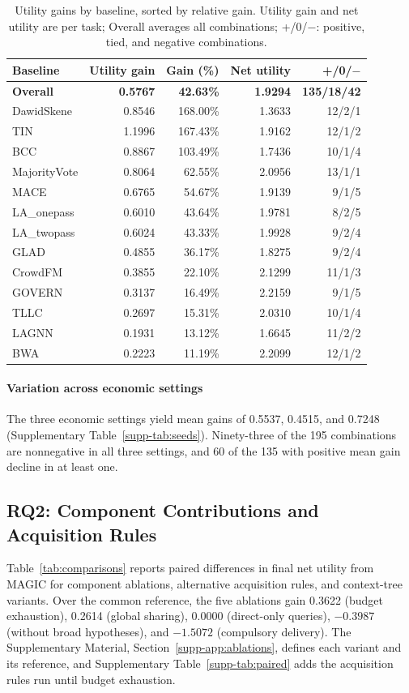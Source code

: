 \documentclass[journal]{IEEEtran}
\newcommand{\smalltable}{\footnotesize\setlength{\tabcolsep}{3.5pt}}
\begin{document}
\begin{table}[t]
\caption{Utility gains by baseline, sorted by relative gain. Utility gain and net utility are per task; Overall averages all combinations; +/0/$-$: positive, tied, and negative combinations.}
\label{tab:upstreams}\centering\smalltable
\begin{tabular}{lrrrr}
\toprule
Baseline & Utility gain & Gain (\%) & Net utility & +/0/$-$ \\
\midrule
\textbf{Overall} & \textbf{0.5767} & \textbf{42.63\%} & \textbf{1.9294} & \textbf{135/18/42} \\
DawidSkene & 0.8546 & 168.00\% & 1.3633 & 12/2/1 \\
TIN & 1.1996 & 167.43\% & 1.9162 & 12/1/2 \\
BCC & 0.8867 & 103.49\% & 1.7436 & 10/1/4 \\
MajorityVote & 0.8064 & 62.55\% & 2.0956 & 13/1/1 \\
MACE & 0.6765 & 54.67\% & 1.9139 & 9/1/5 \\
LA\_onepass & 0.6010 & 43.64\% & 1.9781 & 8/2/5 \\
LA\_twopass & 0.6024 & 43.33\% & 1.9928 & 9/2/4 \\
GLAD & 0.4855 & 36.17\% & 1.8275 & 9/2/4 \\
CrowdFM & 0.3855 & 22.10\% & 2.1299 & 11/1/3 \\
GOVERN & 0.3137 & 16.49\% & 2.2159 & 9/1/5 \\
TLLC & 0.2697 & 15.31\% & 2.0310 & 10/1/4 \\
LAGNN & 0.1931 & 13.12\% & 1.6645 & 11/2/2 \\
BWA & 0.2223 & 11.19\% & 2.2099 & 12/1/2 \\

\bottomrule
\end{tabular}
\end{table}

\paragraph{Variation across economic settings}
The three economic settings yield mean gains of 0.5537, 0.4515, and 0.7248 (Supplementary Table~\ref{supp-tab:seeds}). Ninety-three of the 195 combinations are nonnegative in all three settings, and 60 of the 135 with positive mean gain decline in at least one.

\subsection{RQ2: Component Contributions and Acquisition Rules}
Table~\ref{tab:comparisons} reports paired differences in final net utility from MAGIC for component ablations, alternative acquisition rules, and context-tree variants. Over the common reference, the five ablations gain 0.3622 (budget exhaustion), 0.2614 (global sharing), 0.0000 (direct-only queries), $-0.3987$ (without broad hypotheses), and $-1.5072$ (compulsory delivery). The Supplementary Material, Section~\ref{supp-app:ablations}, defines each variant and its reference, and Supplementary Table~\ref{supp-tab:paired} adds the acquisition rules run until budget exhaustion.
\end{document}
